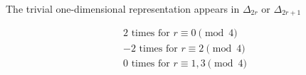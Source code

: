 The trivial one-dimensional representation appears in $\Delta_{2r}$ or $\Delta_{2r+1}$

$$\begin{array}{l}
2 \text{ times for } r \equiv 0 \pmod{4} \\
-2 \text{ times for } r \equiv 2 \pmod{4} \\
0 \text{ times for } r \equiv 1, 3 \pmod{4}
\end{array}$$

